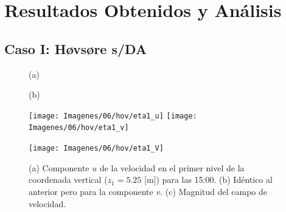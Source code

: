 \chapter{Resultados Obtenidos y Análisis}
\section{Caso I: Høvsøre s/DA}
\newpage
\begin{figure}[H]
	\centering
	\begin{minipage}{0.5\linewidth}
		\center\hspace{0.3cm}(a)
	\end{minipage}%
	\begin{minipage}{0.5\linewidth}
		\center\hspace{0.3cm}(b)
	\end{minipage}%
	
	\texttt{[image: Imagenes/06/hov/eta1\_u]}%
	\texttt{[image: Imagenes/06/hov/eta1\_v]}%
	
	
	\texttt{[image: Imagenes/06/hov/eta1\_V]}%
	\caption{(a) Componente $u$ de la velocidad en el primer nivel de la coordenada vertical ($z_1=5.25$ [m]) para las 15:00. (b) Idéntico al anterior pero para la componente $v$. (c) Magnitud del campo de velocidad.}
	\label{fig:06_hov_eta1}
\end{figure}


